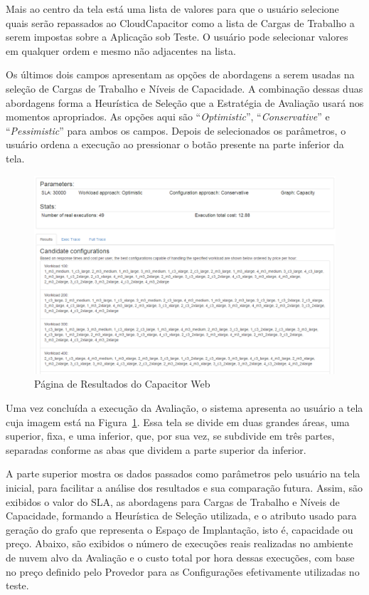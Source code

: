 Mais ao centro da tela está uma lista de valores para que o usuário selecione quais 
serão repassados ao CloudCapacitor como a lista de Cargas de Trabalho a serem impostas
sobre a Aplicação sob Teste. O usuário pode selecionar valores em qualquer ordem e mesmo
não adjacentes na lista.

Os últimos dois campos apresentam as opções de abordagens a serem usadas na seleção de
Cargas de Trabalho e Níveis de Capacidade. A combinação dessas duas abordagens forma a
Heurística de Seleção que a Estratégia de Avaliação usará nos momentos apropriados. As 
opções aqui são ``\emph{Optimistic}'', ``\emph{Conservative}'' e ``\emph{Pessimistic}''
para ambos os campos. Depois de selecionados os parâmetros, o usuário ordena a execução 
ao pressionar o botão presente na parte inferior da tela.

\begin{figure}[htb]
  \begin{center}
    \includegraphics[scale=0.5]{img/CapacitorWeb_Results}
  \end{center}
  \caption{\label{fig:capacitor_web_results}Página de Resultados do Capacitor Web}
\end{figure}

Uma vez concluída a execução da Avaliação, o sistema apresenta ao usuário a tela
cuja imagem está na Figura~\ref{fig:capacitor_web_results}. Essa tela se divide
em duas grandes áreas, uma superior, fixa, e uma inferior, que, por sua vez, 
se subdivide em três partes, separadas conforme as abas que dividem a parte 
superior da inferior.

A parte superior mostra os dados passados como parâmetros pelo usuário na tela
inicial, para facilitar a análise dos resultados e sua comparação futura. Assim,
são exibidos o valor do SLA, as abordagens para Cargas de Trabalho e Níveis de 
Capacidade, formando a Heurística de Seleção utilizada, e o atributo usado para
geração do grafo que representa o Espaço de Implantação, isto é, capacidade ou
preço. Abaixo, são exibidos o número de execuções reais realizadas no ambiente
de nuvem alvo da Avaliação e o custo total por hora dessas execuções, com base
no preço definido pelo Provedor para as Configurações efetivamente utilizadas no 
teste. 
 
